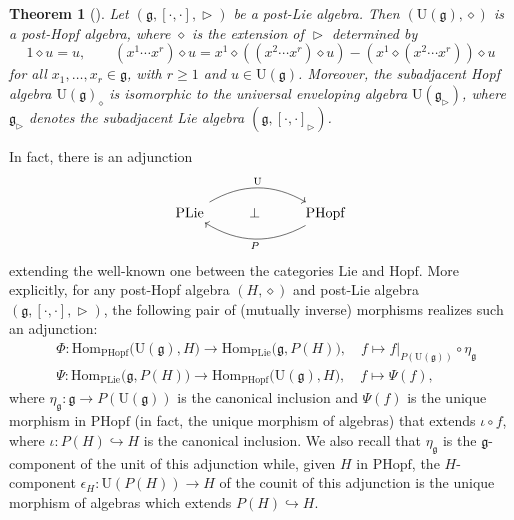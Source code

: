 \documentclass[10pt]{article}
\newtheorem {theorem} [lemma] {Theorem}
\theoremstyle{definition}
\newcommand{\g}{\mathfrak{g}}
\newcommand{\wt}{\vartriangleright}
\renewcommand{\wp}{\diamond}
\begin{document}
\begin{theorem}[{\cite[Theorem 2.8]{LST}}]\label{thm:postHopfonuniversalenveloping}
Let $(\mathfrak{g},[\cdot,\cdot],\wt)$ be a post-Lie algebra. Then $(\mathrm{U}(\mathfrak{g}),\wp)$ is a post-Hopf algebra, where $\wp$ is the extension of $\wt$ determined by
\[
1\wp u=u,\qquad (x^{1}\cdots x^{r})\wp u=x^{1}\wp((x^{2}\cdots x^{r})\wp u)-(x^{1}\wp(x^{2}\cdots x^{r}))\wp u
\]
for all $x_{1},\ldots, x_{r}\in\g$, with $r\geq1$ and $u\in \mathrm{U}(\mathfrak{g})$. Moreover, the subadjacent Hopf algebra $\mathrm{U}(\mathfrak{g})_{\wp}$ is isomorphic to the universal enveloping algebra $\mathrm{U}(\mathfrak{g}_{\wt})$, where $\g_\wt$ denotes the subadjacent Lie algebra $(\mathfrak{g},[\cdot,\cdot]_{\wt})$.
\end{theorem}

In fact, there is an adjunction
\begin{equation}\label{ad:PLiePHopf}
	\begin{tikzcd}
		\mathrm{PLie} \arrow[rr, bend left, "\mathrm{U}"] & \perp & \mathrm{PHopf} \arrow[ll, bend left, "P"]
	\end{tikzcd}
	\end{equation}
extending the well-known one between the categories $\mathrm{Lie}$ and $\mathrm{Hopf}$.
More explicitly, for any post-Hopf algebra $(H, \wp)$ and post-Lie algebra $(\g,[\cdot,\cdot],\wt)$, the following pair of (mutually inverse) morphisms realizes such an adjunction:
\begin{align}
&\Phi:\mathrm{Hom}_{\mathrm{PHopf}}\big(\mathrm{U}(\mathfrak{g}),H\big) \to \mathrm{Hom}_{\mathrm{PLie}}\big(\mathfrak{g},P(H)\big), \quad 
f  \mapsto f|_{P(\mathrm{U}(\mathfrak{g}))}\circ\eta_{\mathfrak{g}} \label{def:Phi}\\
&\Psi:\mathrm{Hom}_{\mathrm{PLie}}\big(\mathfrak{g},P(H)\big) \to \mathrm{Hom}_{\mathrm{PHopf}}\big(\mathrm{U}(\mathfrak{g}),H\big), \quad  f \mapsto \Psi(f)\label{def:Psi},
\end{align}
where $\eta_{\mathfrak{g}}:\mathfrak{g}\to P(\mathrm{U}(\mathfrak{g}))$ is the canonical inclusion and $\Psi(f)$ is the unique morphism in $\mathrm{PHopf}$ (in fact, the unique morphism of algebras) that extends $\iota\circ f$, where $\iota:P(H)\hookrightarrow H$ is the canonical inclusion. 
We also recall that $\eta_{\mathfrak{g}}$ is the $\mathfrak{g}$-component of the unit of this adjunction while, given $H$ in $\mathrm{PHopf}$, the $H$-component $\epsilon_{H}:\mathrm{U}(P(H))\to H$ of the counit of this adjunction is the unique morphism of algebras which extends $P(H)\hookrightarrow H$. \medskip
\end{document}
